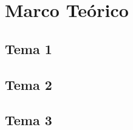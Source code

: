 \chapter{Marco Teórico}
    \lipsum[2]

\section{Tema 1}
    \lipsum[4-5]

\section{Tema 2}
    \lipsum[7] \cite{johnson2025impact}
    
    \lipsum[8]

\section{Tema 3}
    \lipsum[1]